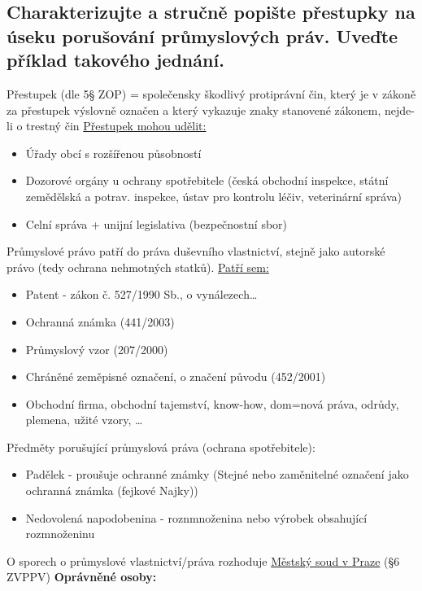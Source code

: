 \subsection{Charakterizujte a stručně popište přestupky na úseku porušování průmyslových práv. Uveďte příklad takového jednání.}
Přestupek (dle 5§ ZOP) = společensky škodlivý protiprávní čin, který je v zákoně za přestupek výslovně označen a který vykazuje znaky stanovené zákonem, nejde-li o trestný čin
\newline\newline\underline{Přestupek mohou udělit:}
\begin{itemize}
    \item Úřady obcí s rozšířenou působností
    \item Dozorové orgány u ochrany spotřebitele (česká obchodní inspekce, státní zemědělská a potrav. inspekce, ústav pro kontrolu léčiv, veterinární správa)
    \item Celní správa + unijní legislativa (bezpečnostní sbor)
\end{itemize}
Průmyslové právo patří do práva duševního vlastnictví, stejně jako autorské právo (tedy ochrana nehmotných statků).
\newline\newline\underline{Patří sem:}
\begin{itemize}
    \item Patent - zákon č. 527/1990 Sb., o vynálezech…
    \item Ochranná známka (441/2003)
    \item Průmyslový vzor (207/2000)
    \item Chráněné zeměpisné označení, o značení původu (452/2001)
    \item Obchodní firma, obchodní tajemství, know-how, dom=nová práva, odrůdy, plemena, užité vzory, …
\end{itemize}
Předměty porušující průmyslová práva (ochrana spotřebitele):
\begin{itemize}
    \item Padělek - proušuje ochranné známky (Stejné nebo zaměnitelné označení jako ochranná známka (fejkové Najky))
    \item Nedovolená napodobenina - roznmnoženina nebo výrobek obsahující rozmnoženinu
\end{itemize}
O sporech o průmyslové vlastnictví/práva rozhoduje \underline{Městský soud v Praze} (§6 ZVPPV)
\newline\newline\textbf{Oprávněné osoby:}
